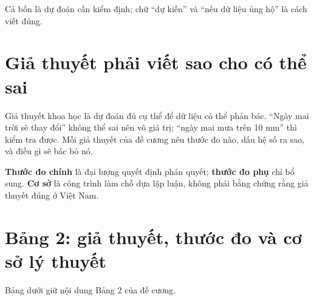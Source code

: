 Cả bốn là dự đoán cần kiểm định; chữ “dự kiến” và “nếu dữ liệu ủng hộ” là cách viết đúng.

\section{Giả thuyết phải viết sao cho có thể sai}

Giả thuyết khoa học là dự đoán đủ cụ thể để dữ liệu có thể phản bác. “Ngày mai trời sẽ thay đổi” không thể sai nên vô giá trị; “ngày mai mưa trên 10 mm” thì kiểm tra được. Mỗi giả thuyết của đề cương nêu thước đo nào, dấu hệ số ra sao, và điều gì sẽ bác bỏ nó.

\textbf{Thước đo chính} là đại lượng quyết định phán quyết; \textbf{thước đo phụ} chỉ bổ sung. \textbf{Cơ sở} là công trình làm chỗ dựa lập luận, không phải bằng chứng rằng giả thuyết đúng ở Việt Nam.

\section{Bảng 2: giả thuyết, thước đo và cơ sở lý thuyết}

Bảng dưới giữ nội dung Bảng 2 của đề cương.

